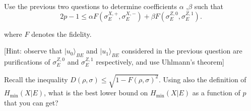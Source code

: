 \documentclass[a4paper,10pt,landscape,twocolumn]{scrartcl}
\begin{document}
\begin{exercise}
\begin{subex}[Problem 4]
Use the previous two questions to determine coefficients $\alpha$ ,$\beta$ such that
\begin{equation}
2p-1 \leq \alpha F(\sigma _ E^{X,+},\sigma _ E^{X,-}) + \beta F(\sigma _ E^{Z,0},\sigma _ E^{Z,1}).
\end{equation}


where $F$ denotes the fidelity.

[Hint: observe that $|u_0\rangle _{BE}$ and $|u_1\rangle _{BE}$ considered in the previous question are purifications of $\sigma _ E^{Z,0}$ and $\sigma _ E^{Z,1}$ respectively, and use Uhlmann's theorem] 
\end{subex}

\begin{subex}[Problem 5]
Recall the inequality $D(\rho ,\sigma ) \leq \sqrt {1-F(\rho ,\sigma )^2}$. Using also the definition of $H_{\min} (X|E)$, what is the best lower bound on $H_{\min}(X|E)$ as a function of $p$ that you can get?
\end{subex}


\end{exercise}
\end{document}

